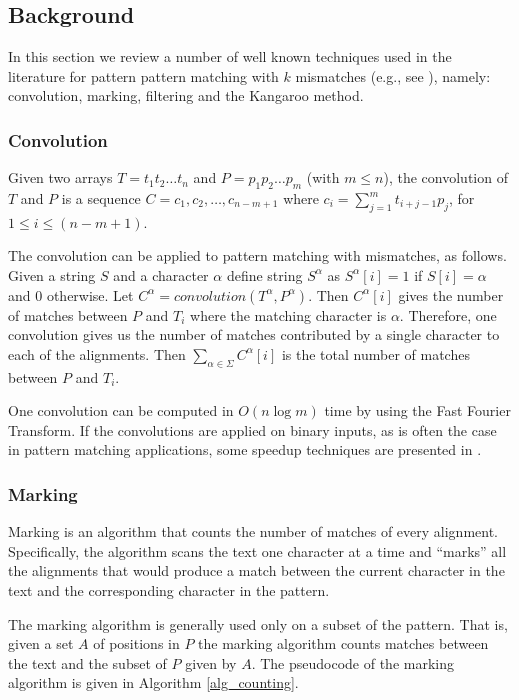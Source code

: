 
\subsection{Background}
In this section we review a number of well known
techniques used in the literature for pattern pattern matching with $k$ mismatches (e.g., see
\cite{ALP04}), namely: convolution, marking, filtering and the Kangaroo method.




 

\subsubsection{Convolution}
Given two arrays $T=t_1t_2\ldots t_n$ and $P=p_1p_2\ldots
p_m$ (with $m\leq n$), the convolution of $T$ and $P$ is a sequence
$C=c_1,c_2,\ldots,c_{n-m+1}$ where $c_i=\sum_{j=1}^mt_{i+j-1}p_j$, for $1\leq
i\leq (n-m+1)$. 

The convolution can be applied to pattern matching with mismatches, as follows.
Given a string $S$ and a character $\alpha$ define string $S^{\alpha}$
as $S^\alpha[i]=1$ if $S[i]=\alpha$ and $0$ otherwise.
Let $C^\alpha=convolution(T^\alpha, P^\alpha)$. Then $C^\alpha[i]$ gives the
number of matches between $P$ and $T_i$
where the matching character is $\alpha$. Therefore, one convolution gives us
the number of matches contributed by a single character to each of the
alignments. Then $\sum_{\alpha \in \Sigma}C^{\alpha}[i]$ is the total number of
matches between $P$ and $T_i$.

One convolution can be computed in
$O(n\log m)$ time by using the Fast Fourier Transform. 
If the convolutions are applied on binary inputs, as is often the case in
pattern matching applications, some speedup techniques are presented in \cite{FG09}.

\subsubsection{Marking}\label{sec_marking} 

Marking is an algorithm that counts the number of matches of
every alignment.
Specifically, the algorithm scans the text one character at a time
and ``marks'' all the alignments that would produce a match between the current
character in the text and the corresponding character in the pattern. 

The marking algorithm is generally used only on a subset of the pattern. That
is, given a set $A$ of positions in $P$ the marking algorithm counts matches
between the text and the subset of $P$ given by $A$. The pseudocode of the
marking algorithm is given in Algorithm \ref{alg_counting}.

